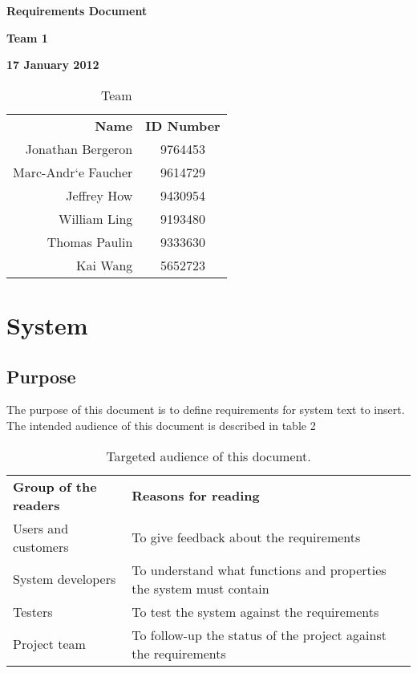 \documentclass[12pt]{article}
\newcommand{\systemName}{text to insert}
\begin{document}
\vspace*{0.5in}
\centerline{\bf\Large Requirements Document}

\vspace*{0.5in}
\centerline{\bf\Large Team 1}

\vspace*{0.5in}
\centerline{\bf\Large 17 January 2012}

\vspace*{1.5in}
\begin{table}[htbp]
\caption{Team}
\begin{center}
\begin{tabular}{|r | c|}
\hline
{\bf Name} & {\bf ID Number} \\
Jonathan Bergeron & 9764453 \\
Marc-Andr`{e} Faucher & 9614729 \\
Jeffrey How & 9430954 \\
William Ling & 9193480 \\
Thomas Paulin & 9333630 \\
Kai Wang & 5652723 \\
\hline
\end{tabular}
\end{center}
\end{table}

\clearpage

\section{System}

\subsection{Purpose}
The purpose of this document is to define requirements for system \systemName.
\newline\newline
The intended audience of this document is described in table 2
\newline
\begin{table}[htbp]
\caption{Targeted audience of this document.}
\begin{center}
\begin{tabular}{|l | l|}
\hline
{\bf Group of the readers} & {\bf Reasons for reading}\\ \cline{1-2}
Users and customers & To give feedback about the requirements\\ \cline{1-2}
System developers & To understand what functions and properties the system must contain\\ \cline{1-2}
Testers & To test the system against the requirements\\ \cline{1-2}
Project team & To follow-up the status of the project against the requirements\\ \cline{1-2}
\hline
\end{tabular}
\end{center}
\end{table}
\end{document}
